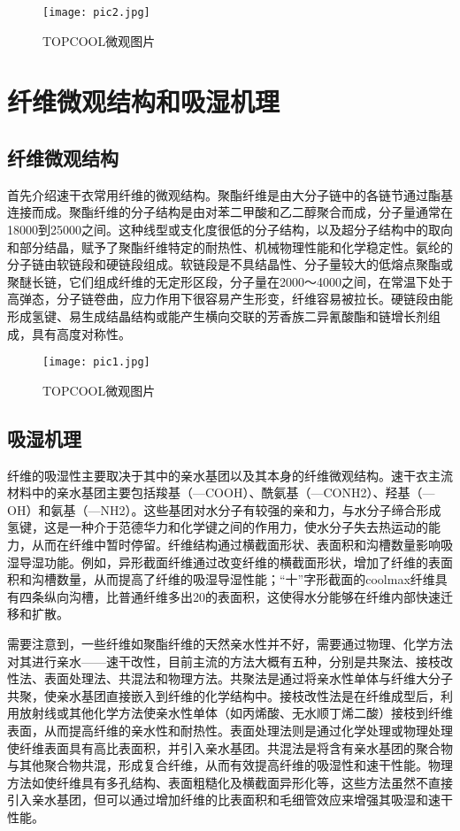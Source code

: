 \documentclass{article}
\begin{document}
\begin{multicols}{2}
\begin{figure}[H]
    \centering
    \texttt{[image: pic2.jpg]}
    \caption{TOPCOOL微观图片}
    \label{fig:image_label}
\end{figure}


\section{纤维微观结构和吸湿机理\cite{Wei2015}} 
\subsection{纤维微观结构\cite{Zhu2006}}
首先介绍速干衣常用纤维的微观结构。聚酯纤维是由大分子链中的各链节通过酯基连接而成。聚酯纤维的分子结构是由对苯二甲酸和乙二醇聚合而成，分子量通常在18000到25000之间。这种线型或支化度很低的分子结构，以及超分子结构中的取向和部分结晶，赋予了聚酯纤维特定的耐热性、机械物理性能和化学稳定性。氨纶的分子链由软链段和硬链段组成。软链段是不具结晶性、分子量较大的低熔点聚酯或聚醚长链，它们组成纤维的无定形区段，分子量在2000～4000之间，在常温下处于高弹态，分子链卷曲，应力作用下很容易产生形变，纤维容易被拉长。硬链段由能形成氢键、易生成结晶结构或能产生横向交联的芳香族二异氰酸酯和链增长剂组成，具有高度对称性。 

\begin{figure}[H]
    \centering
    \texttt{[image: pic1.jpg]}
    \caption{TOPCOOL微观图片}
    \label{fig:image_label}
\end{figure}
\subsection{吸湿机理\cite{Yu2020} \cite{zhang2013}} 
纤维的吸湿性主要取决于其中的亲水基团以及其本身的纤维微观结构。速干衣主流材料中的亲水基团主要包括羧基（—COOH）、酰氨基（—CONH2）、羟基（—OH）和氨基（—NH2）。这些基团对水分子有较强的亲和力，与水分子缔合形成氢键，这是一种介于范德华力和化学键之间的作用力，使水分子失去热运动的能力，从而在纤维中暂时停留。纤维结构通过横截面形状、表面积和沟槽数量影响吸湿导湿功能。例如，异形截面纤维通过改变纤维的横截面形状，增加了纤维的表面积和沟槽数量，从而提高了纤维的吸湿导湿性能；“十”字形截面的coolmax纤维具有四条纵向沟槽，比普通纤维多出20的表面积，这使得水分能够在纤维内部快速迁移和扩散。


需要注意到，一些纤维如聚酯纤维的天然亲水性并不好，需要通过物理、化学方法对其进行亲水——速干改性，目前主流的方法大概有五种，分别是共聚法、接枝改性法、表面处理法、共混法和物理方法。共聚法是通过将亲水性单体与纤维大分子共聚，使亲水基团直接嵌入到纤维的化学结构中。接枝改性法是在纤维成型后，利用放射线或其他化学方法使亲水性单体（如丙烯酸、无水顺丁烯二酸）接枝到纤维表面，从而提高纤维的亲水性和耐热性。表面处理法则是通过化学处理或物理处理使纤维表面具有高比表面积，并引入亲水基团。共混法是将含有亲水基团的聚合物与其他聚合物共混，形成复合纤维，从而有效提高纤维的吸湿性和速干性能。物理方法如使纤维具有多孔结构、表面粗糙化及横截面异形化等，这些方法虽然不直接引入亲水基团，但可以通过增加纤维的比表面积和毛细管效应来增强其吸湿和速干性能。

\end{multicols}
\end{document}
